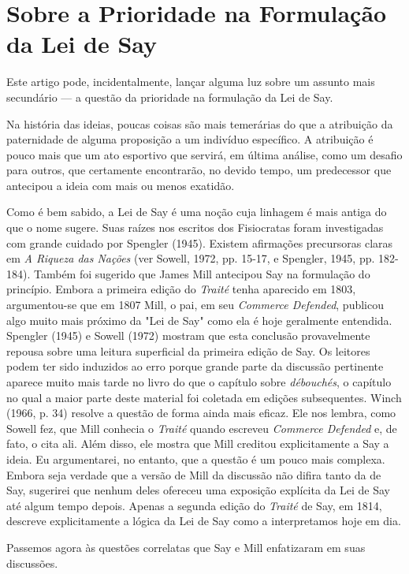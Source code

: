 \documentclass[12pt]{article}
\begin{document}
\section{Sobre a Prioridade na Formulação da Lei de Say}

Este artigo pode, incidentalmente, lançar alguma luz sobre um assunto mais secundário — a questão da prioridade na formulação da Lei de Say.

Na história das ideias, poucas coisas são mais temerárias do que a atribuição da paternidade de alguma proposição a um indivíduo específico. A atribuição é pouco mais que um ato esportivo que servirá, em última análise, como um desafio para outros, que certamente encontrarão, no devido tempo, um predecessor que antecipou a ideia com mais ou menos exatidão.

Como é bem sabido, a Lei de Say é uma noção cuja linhagem é mais antiga do que o nome sugere. Suas raízes nos escritos dos Fisiocratas foram investigadas com grande cuidado por Spengler (1945). Existem afirmações precursoras claras em \textit{A Riqueza das Nações} (ver Sowell, 1972, pp. 15-17, e Spengler, 1945, pp. 182-184). Também foi sugerido que James Mill antecipou Say na formulação do princípio. Embora a primeira edição do \textit{Traité} tenha aparecido em 1803, argumentou-se que em 1807 Mill, o pai, em seu \textit{Commerce Defended}, publicou algo muito mais próximo da "Lei de Say" como ela é hoje geralmente entendida. Spengler (1945) e Sowell (1972) mostram que esta conclusão provavelmente repousa sobre uma leitura superficial da primeira edição de Say. Os leitores podem ter sido induzidos ao erro porque grande parte da discussão pertinente aparece muito mais tarde no livro do que o capítulo sobre \textit{débouchés}, o capítulo no qual a maior parte deste material foi coletada em edições subsequentes. Winch (1966, p. 34) resolve a questão de forma ainda mais eficaz. Ele nos lembra, como Sowell fez, que Mill conhecia o \textit{Traité} quando escreveu \textit{Commerce Defended} e, de fato, o cita ali. Além disso, ele mostra que Mill creditou explicitamente a Say a ideia. Eu argumentarei, no entanto, que a questão é um pouco mais complexa. Embora seja verdade que a versão de Mill da discussão não difira tanto da de Say, sugerirei que nenhum deles ofereceu uma exposição explícita da Lei de Say até algum tempo depois. Apenas a segunda edição do \textit{Traité} de Say, em 1814, descreve explicitamente a lógica da Lei de Say como a interpretamos hoje em dia.

Passemos agora às questões correlatas que Say e Mill enfatizaram em suas discussões.
\end{document}
